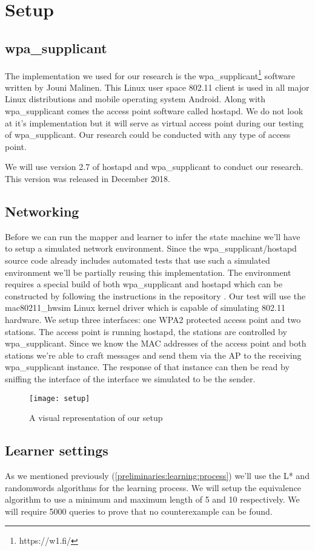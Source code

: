 \section{Setup}

\subsection{wpa\_supplicant}

The implementation we used for our research is the wpa\_supplicant\footnote{https://w1.fi/} software written by Jouni Malinen. This Linux user space 802.11 client is used in all major Linux distributions and mobile operating system Android.
Along with wpa\_supplicant comes the access point software called hostapd. We do not look at it's implementation but it will serve as virtual access point during our testing of wpa\_supplicant. Our research could be conducted with any type of access point.

We will use version 2.7 of hostapd and wpa\_supplicant to conduct our research. This version was released in December 2018.

\subsection{Networking}

Before we can run the mapper and learner to infer the state machine we'll have to setup a simulated network environment. Since the wpa\_supplicant/hostapd source code already includes automated tests that use such a simulated environment we'll be partially reusing this implementation.
The environment requires a special build of both wpa\_supplicant and hostapd which can be constructed by following the instructions in the repository \cite{Malinen:2013}.
Our test will use the mac80211\_hwsim Linux kernel driver which is capable of simulating 802.11 hardware. We setup three interfaces: one WPA2 protected access point and two stations. The access point is running hostapd, the stations are controlled by wpa\_supplicant. Since we know the MAC addresses of the access point and both stations we're able to craft messages and send them via the AP to the receiving wpa\_supplicant instance. The response of that instance can then be read by sniffing the interface of the interface we simulated to be the sender.

\begin{figure}[!h]
	\centering
	\texttt{[image: setup]}
	\caption{A visual representation of our setup}
	\label{fig:setup}
\end{figure}

\subsection{Learner settings}

As we mentioned previously (\ref{preliminaries:learning:process}) we'll use the L* and randomwords algorithms for the learning process. We will setup the equivalence algorithm to use a minimum and maximum length of 5 and 10 respectively. We will require 5000 queries to prove that no counterexample can be found.